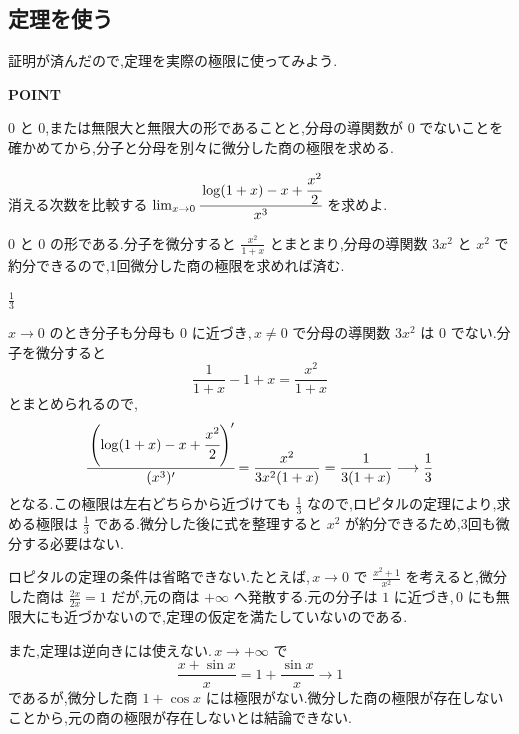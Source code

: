 \subsection{定理を使う}
証明が済んだので,定理を実際の極限に使ってみよう.

\begin{bookpoint}
\textbf{POINT}\par
$0$ と $0$,または無限大と無限大の形であることと,分母の導関数が $0$ でないことを確かめてから,分子と分母を別々に微分した商の極限を求める.
\end{bookpoint}

\begin{example}{消える次数を比較する}
$\lim_{x\to0}\cfrac{\log(1+x)-x+\cfrac{x^2}{2}}{x^3}$ を求めよ.
\end{example}

$0$ と $0$ の形である.分子を微分すると $\frac{x^2}{1+x}$ とまとまり,分母の導関数 $3x^2$ と $x^2$ で約分できるので,1回微分した商の極限を求めれば済む.

$\frac13$

$x\to0$ のとき分子も分母も $0$ に近づき,\,$x\ne0$ で分母の導関数 $3x^2$ は $0$ でない.分子を微分すると
\[
 \frac1{1+x}-1+x=\frac{x^2}{1+x}
\]
とまとめられるので,
\[
 \cfrac{\left(\log(1+x)-x+\cfrac{x^2}{2}\right)'}{(x^3)'}
 =\frac{x^2}{3x^2(1+x)}
 =\frac1{3(1+x)}\longrightarrow\frac13
\]
となる.この極限は左右どちらから近づけても $\frac13$ なので,ロピタルの定理により,求める極限は $\frac13$ である.微分した後に式を整理すると $x^2$ が約分できるため,3回も微分する必要はない.

ロピタルの定理の条件は省略できない.たとえば,\,$x\to0$ で $\frac{x^2+1}{x^2}$ を考えると,微分した商は $\frac{2x}{2x}=1$ だが,元の商は $+\infty$ へ発散する.元の分子は $1$ に近づき,\,$0$ にも無限大にも近づかないので,定理の仮定を満たしていないのである.

また,定理は逆向きには使えない.\,$x\to+\infty$ で
\[
 \frac{x+\sin x}{x}=1+\frac{\sin x}{x}\longrightarrow1
\]
であるが,微分した商 $1+\cos x$ には極限がない.微分した商の極限が存在しないことから,元の商の極限が存在しないとは結論できない.
